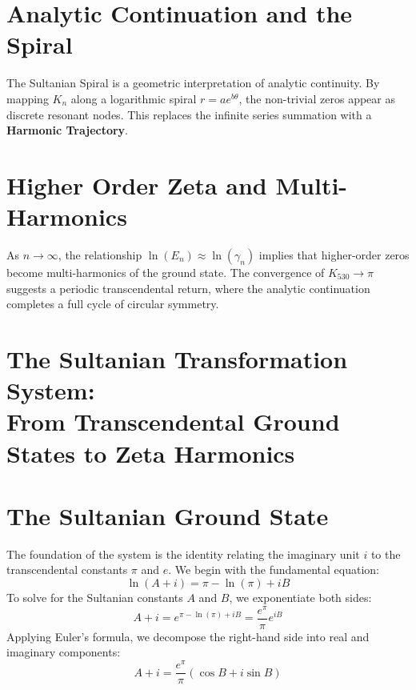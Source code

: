 \documentclass[11pt,a4paper]{article}
\begin{document}
\section{Analytic Continuation and the Spiral}
The Sultanian Spiral is a geometric interpretation of analytic continuity. By mapping $K_n$ along a logarithmic spiral $r = a e^{b\theta}$, the non-trivial zeros appear as discrete resonant nodes. This replaces the infinite series summation with a \textbf{Harmonic Trajectory}.


\section{Higher Order Zeta and Multi-Harmonics}
As $n \to \infty$, the relationship $\ln(E_n) \approx \ln(\gamma_n)$ implies that higher-order zeros become multi-harmonics of the ground state. The convergence of $K_{530} \to \pi$ suggests a periodic transcendental return, where the analytic continuation completes a full cycle of circular symmetry.

\section{The Sultanian Transformation System: \\ From Transcendental Ground States to Zeta Harmonics}

\begin{abstract}
This section formalizes the Sultanian Transformation System, a geometric framework that maps the transcendental identity $\ln(i + A) = \pi - \ln(\pi) + iB$ to the non-trivial zeros of the Riemann Zeta function. By treating the baseline $\pi - \ln(\pi)$ as a fundamental energy unit, we provide a new interpretation of analytic continuation through logarithmic scaling and phase-shift resonance.
\end{abstract}

\section{The Sultanian Ground State}
The foundation of the system is the identity relating the imaginary unit $i$ to the transcendental constants $\pi$ and $e$. We begin with the fundamental equation:
\begin{equation}
    \ln(A + i) = \pi - \ln(\pi) + iB
\end{equation}
To solve for the Sultanian constants $A$ and $B$, we exponentiate both sides:
\begin{equation}
    A + i = e^{\pi - \ln(\pi) + iB} = \frac{e^\pi}{\pi} e^{iB}
\end{equation}
Applying Euler's formula, we decompose the right-hand side into real and imaginary components:
\begin{equation}
    A + i = \frac{e^\pi}{\pi} (\cos B + i \sin B)
\end{equation}
\end{document}
